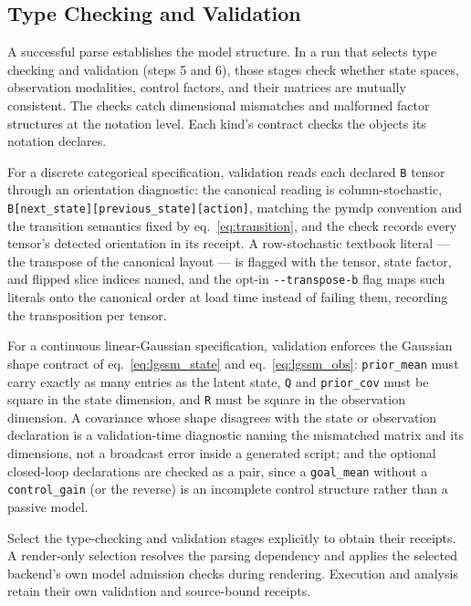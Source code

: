 \documentclass[
  english,
  9pt,
]{extarticle}
\begin{document}
\subsection{Type Checking and
Validation}\label{type-checking-and-validation}

A successful parse establishes the model structure. In a run that
selects type checking and validation (steps 5 and 6), those stages check
whether state spaces, observation modalities, control factors, and their
matrices are mutually consistent. The checks catch dimensional
mismatches and malformed factor structures at the notation level. Each
kind's contract checks the objects its notation declares.

For a discrete categorical specification, validation reads each declared
\texttt{B} tensor through an orientation diagnostic: the canonical
reading is column-stochastic,
\texttt{B{[}next\_state{]}{[}previous\_state{]}{[}action{]}}, matching
the pymdp convention \citep{heins2022} and the transition semantics
fixed by eq.~\ref{eq:transition}, and the check records every tensor's
detected orientation in its receipt. A row-stochastic textbook literal
--- the transpose of the canonical layout --- is flagged with the
tensor, state factor, and flipped slice indices named, and the opt-in
\texttt{-\/-transpose-b} flag maps such literals onto the canonical
order at load time instead of failing them, recording the transposition
per tensor.

For a continuous linear-Gaussian specification, validation enforces the
Gaussian shape contract of eq.~\ref{eq:lgssm_state} and
eq.~\ref{eq:lgssm_obs}: \texttt{prior\_mean} must carry exactly as many
entries as the latent state, \texttt{Q} and \texttt{prior\_cov} must be
square in the state dimension, and \texttt{R} must be square in the
observation dimension. A covariance whose shape disagrees with the state
or observation declaration is a validation-time diagnostic naming the
mismatched matrix and its dimensions, not a broadcast error inside a
generated script; and the optional closed-loop declarations are checked
as a pair, since a \texttt{goal\_mean} without a \texttt{control\_gain}
(or the reverse) is an incomplete control structure rather than a
passive model.

Select the type-checking and validation stages explicitly to obtain
their receipts. A render-only selection resolves the parsing dependency
and applies the selected backend's own model admission checks during
rendering. Execution and analysis retain their own validation and
source-bound receipts.
\end{document}
